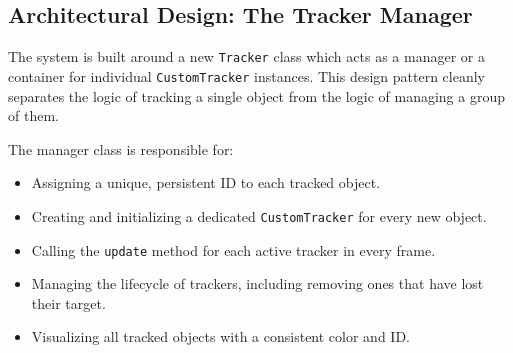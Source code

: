 \documentclass[12pt, a4paper]{article}
\begin{document}
\subsection{Architectural Design: The Tracker Manager}
The system is built around a new \lstinline!Tracker! class which acts as a manager or a container for individual \lstinline!CustomTracker! instances. This design pattern cleanly separates the logic of tracking a single object from the logic of managing a group of them.

The manager class is responsible for:
\begin{itemize}
    \item Assigning a unique, persistent ID to each tracked object.
    \item Creating and initializing a dedicated \lstinline!CustomTracker! for every new object.
    \item Calling the \lstinline!update! method for each active tracker in every frame.
    \item Managing the lifecycle of trackers, including removing ones that have lost their target.
    \item Visualizing all tracked objects with a consistent color and ID.
\end{itemize}
\end{document}

